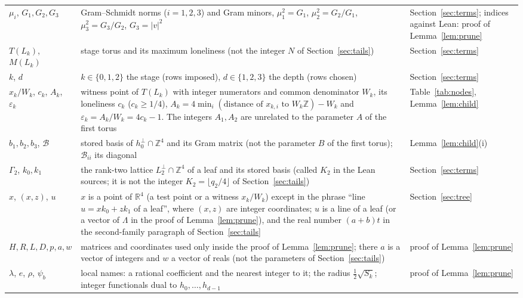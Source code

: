 \documentclass[11pt]{article}
\theoremstyle{remark}
\newcommand{\R}{\mathbb{R}}
\newcommand{\Z}{\mathbb{Z}}
\begin{document}
{\begin{longtable}{p{2.9cm}p{7.6cm}p{4.0cm}}
$\mu_i$, $G_1,G_2,G_3$ & Gram--Schmidt norms ($i=1,2,3$) and Gram minors, $\mu_1^2=G_1$, $\mu_2^2=G_2/G_1$, $\mu_3^2=G_3/G_2$, $G_3=|v|^2$ & Section~\ref{sec:terms}; indices against Lean: proof of Lemma~\ref{lem:prune}\\
$T(L_k)$, $M(L_k)$ & stage torus and its maximum loneliness (not the integer $N$ of Section~\ref{sec:tails}) & Section~\ref{sec:terms}\\
$k$, $d$ & $k\in\{0,1,2\}$ the stage (rows imposed), $d\in\{1,2,3\}$ the depth (rows chosen) & Section~\ref{sec:terms}\\
$x_k/W_k$, $c_k$, $A_k$, $\varepsilon_k$ & witness point of $T(L_k)$ with integer numerators and common denominator $W_k$, its loneliness $c_k$ ($c_k\ge1/4$), $A_k=4\min_i(\text{distance of }x_{k,i}\text{ to }W_k\Z)-W_k$ and $\varepsilon_k=A_k/W_k=4c_k-1$. The integers $A_1,A_2$ are unrelated to the parameter $A$ of the first torus & Table~\ref{tab:nodes}, Lemma~\ref{lem:child}\\
$b_1,b_2,b_3$, $\mathcal B$ & stored basis of $h_0^\perp\cap\Z^4$ and its Gram matrix (not the parameter $B$ of the first torus); $\mathcal B_{ii}$ its diagonal & Lemma~\ref{lem:child}(i)\\
$\Gamma_2$, $k_0,k_1$ & the rank-two lattice $L_2^\perp\cap\Z^4$ of a leaf and its stored basis (called $K_2$ in the Lean sources; it is not the integer $K_2=\lfloor q_2/4\rfloor$ of Section~\ref{sec:tails}) & Section~\ref{sec:terms}\\
$x$, $(x,z)$, $u$ & $x$ is a point of $\R^4$ (a test point or a witness $x_k/W_k$) except in the phrase ``line $u=xk_0+zk_1$ of a leaf'', where $(x,z)$ are integer coordinates; $u$ is a line of a leaf (or a vector of $\Lambda$ in the proof of Lemma~\ref{lem:prune}), and the real number $(a+b)t$ in the second-family paragraph of Section~\ref{sec:tails} & Section~\ref{sec:tree}\\
$H,R,L,D,p,a,w$ & matrices and coordinates used only inside the proof of Lemma~\ref{lem:prune}; there $a$ is a vector of integers and $w$ a vector of reals (not the parameters of Section~\ref{sec:tails}) & proof of Lemma~\ref{lem:prune}\\
$\lambda$, $e$, $\rho$, $\psi_b$ & local names: a rational coefficient and the nearest integer to it; the radius $\frac12\sqrt{S_k}$; integer functionals dual to $h_0,\dots,h_{d-1}$ & proof of Lemma~\ref{lem:prune}\\
\bottomrule
\end{longtable}
}
\end{document}
